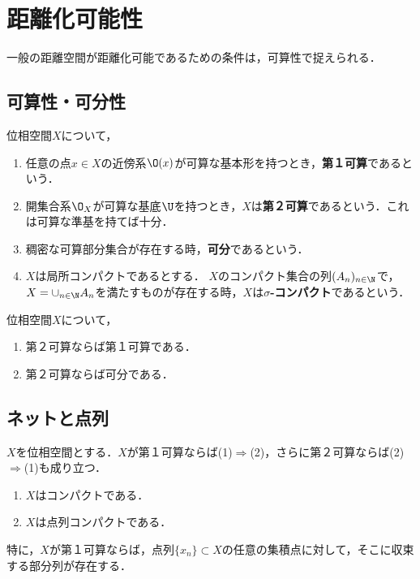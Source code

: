 \documentclass[uplatex,dvipdfmx]{jsreport}
\begin{document}
\section{距離化可能性}

\begin{tcolorbox}[colframe=ForestGreen, colback=ForestGreen!10!white,breakable,colbacktitle=ForestGreen!40!white,coltitle=black,fonttitle=\bfseries\sffamily,
title=]
    一般の距離空間が距離化可能であるための条件は，可算性で捉えられる．
\end{tcolorbox}

\subsection{可算性・可分性}

\begin{definition}
    位相空間$X$について，
    \begin{enumerate}
        \item 任意の点$x\in X$の近傍系$\O(x)$が可算な基本形を持つとき，\textbf{第１可算}であるという．
        \item 開集合系$\O_X$が可算な基底$\U$を持つとき，$X$は\textbf{第２可算}であるという．これは可算な準基を持てば十分．
        \item 稠密な可算部分集合が存在する時，\textbf{可分}であるという．
        \item $X$は局所コンパクトであるとする．
        $X$のコンパクト集合の列$(A_n)_{n\in\N}$で，$X=\cup_{n\in\N}A_n$を満たすものが存在する時，$X$は\textbf{$\sigma$-コンパクト}であるという．
    \end{enumerate}
\end{definition}

\begin{proposition}
    位相空間$X$について，
    \begin{enumerate}
        \item 第２可算ならば第１可算である．
        \item 第２可算ならば可分である．
    \end{enumerate}
\end{proposition}

\subsection{ネットと点列}

\begin{theorem}
    $X$を位相空間とする．$X$が第１可算ならば(1)$\Rightarrow$(2)，さらに第２可算ならば(2)$\Rightarrow$(1)も成り立つ．
    \begin{enumerate}
        \item $X$はコンパクトである．
        \item $X$は点列コンパクトである．
    \end{enumerate}
    特に，$X$が第１可算ならば，点列$\{x_n\}\subset X$の任意の集積点に対して，そこに収束する部分列が存在する．
\end{theorem}
\end{document}
